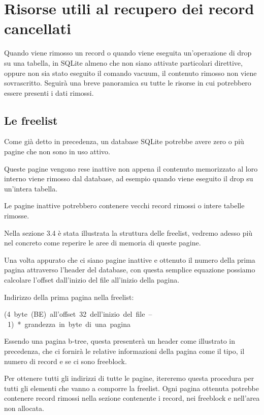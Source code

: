 


\chapter{Risorse utili al recupero dei record cancellati}
Quando viene rimosso un record o quando viene eseguita un'operazione di drop su una tabella, in SQLite almeno che non siano attivate particolari direttive, oppure non sia stato eseguito il comando vacuum, il contenuto rimosso non viene sovrascritto. Seguirà una breve panoramica su tutte le risorse in cui potrebbero essere presenti i dati rimossi.

\section{Le freelist}
Come già detto in precedenza, un database SQLite potrebbe avere zero o più pagine che non sono in uso attivo. 

Queste pagine vengono rese inattive non appena il contenuto memorizzato al loro interno viene rimosso dal database, ad esempio quando viene eseguito il drop su un'intera tabella.

Le pagine inattive potrebbero contenere vecchi record rimossi o intere tabelle rimosse.

Nella sezione 3.4 è stata illustrata la struttura delle freelist, vedremo adesso più nel concreto come reperire le aree di memoria di queste pagine.

Una volta appurato che ci siano pagine inattive e ottenuto il numero della prima pagina attraverso l'header del database, con questa semplice equazione possiamo calcolare l'offset dall'inizio del file all'inizio della pagina.

\medskip

Indirizzo della prima pagina nella freelist:

\medskip

\mbox{(4 byte (BE) all’offset 32 dell’inizio del file – 1) * grandezza in byte di una pagina}

\medskip

Essendo una pagina b-tree, questa presenterà un header come illustrato in precedenza, che ci fornirà le relative informazioni della pagina come il tipo, il numero di record e se ci sono freeblock.

Per ottenere tutti gli indirizzi di tutte le pagine, itereremo questa procedura per tutti gli elementi che vanno a comporre la freelist. Ogni pagina ottenuta potrebbe contenere record rimossi nella sezione contenente i record, nei freeblock e nell'area non allocata. 

